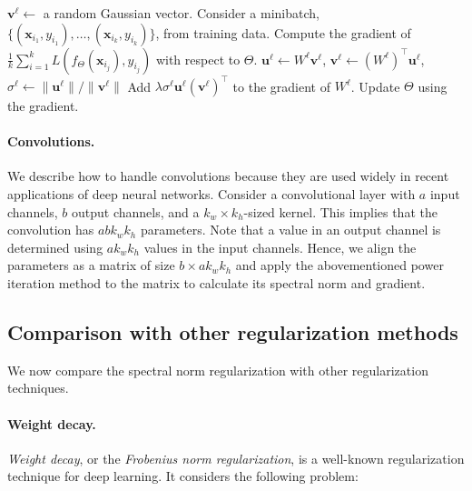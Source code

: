 \begin{algorithm}[t!]
  \caption{SGD with spectral norm regularization}\label{alg:spectral}
  \begin{algorithmic}[1]
      \State ${\bm v}^\ell \leftarrow$ a random Gaussian vector.
    \EndFor
      \State Consider a minibatch, $\{({\bm x}_{i_1},y_{i_1}),\ldots,({\bm x}_{i_k},y_{i_k})\}$, from training data.
      \State Compute the gradient of $\frac{1}{k}\sum_{i=1}^k L(f_{\Theta}({\bm x}_{i_j}),y_{i_j})$ with respect to $\Theta$.
         
          \State ${\bm u}^\ell \leftarrow W^\ell {\bm v}^\ell$, ${\bm v}^\ell \leftarrow (W^\ell)^\top {\bm u}^\ell$, $\sigma^\ell \leftarrow \|{\bm u}^\ell\|/\|{\bm v}^\ell\|$
          \State Add $\lambda \sigma^\ell {\bm u}^\ell ({\bm v}^\ell)^\top$ to the gradient of $W^\ell$.
        \EndFor
      \EndFor \State Update $\Theta$ using the gradient.
    \EndFor
  \end{algorithmic}
\end{algorithm}

\paragraph{Convolutions.}
We describe how to handle convolutions because they are used widely in recent applications of  deep neural networks. Consider a convolutional layer with $a$ input channels, $b$ output channels, and a $k_w \times k_h$-sized kernel. This implies that the convolution has $abk_wk_h$ parameters. Note that a value in an output channel is determined using $ak_wk_h$ values in the input channels. Hence, we align the parameters as a matrix of size $b \times ak_wk_h$ and apply the abovementioned power iteration method to the matrix to calculate its spectral norm and gradient.

\subsection{Comparison with other regularization methods} We now compare the spectral norm regularization with other regularization techniques.
\paragraph{Weight decay.}

\emph{Weight decay}, or the \emph{Frobenius norm regularization}, is a well-known regularization technique for deep learning. It considers the following problem:

